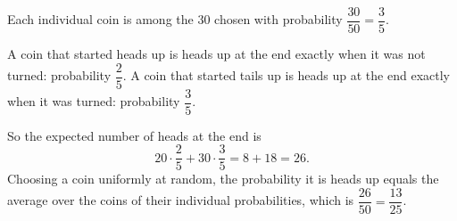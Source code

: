 Each individual coin is among the $30$ chosen with probability $\dfrac{30}{50}=\dfrac{3}{5}$.

A coin that started heads up is heads up at the end exactly when it was not turned: probability $\dfrac{2}{5}$. A coin that started tails up is heads up at the end exactly when it was turned: probability $\dfrac{3}{5}$.

So the expected number of heads at the end is
\[
20\cdot\dfrac{2}{5}+30\cdot\dfrac{3}{5}=8+18=26 .
\]
Choosing a coin uniformly at random, the probability it is heads up equals the average over the coins of their individual probabilities, which is $\dfrac{26}{50}=\boxed{\dfrac{13}{25}}$.
